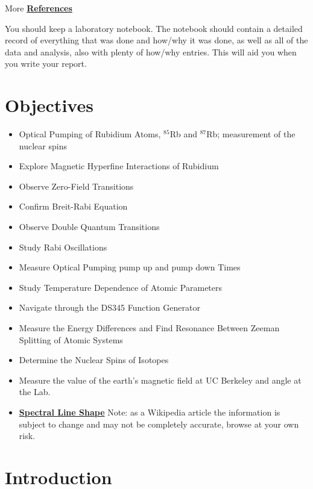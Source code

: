 \documentclass{../lab}
\newcommand{\SpectralLineShape}{https://en.wikipedia.org/wiki/Spectral_line_shape}
\begin{document}
\vspace{1em}

\noindent More \hyperref[references]{\textbf{References}}

\vspace{1em}

\noindent You should keep a laboratory notebook. The notebook should contain a detailed record of everything that was done and how/why it was done, as well as all of the data and analysis, also with plenty of how/why entries. This will aid you when you write your report.

\section{Objectives}
\begin{itemize}
    \item Optical Pumping of Rubidium Atoms, $^{85}$Rb and $^{87}$Rb; measurement of the nuclear spins
    \item Explore Magnetic Hyperfine Interactions of Rubidium
    \item Observe Zero-Field Transitions
    \item Confirm Breit-Rabi Equation
    \item Observe Double Quantum Transitions
    \item Study Rabi Oscillations
    \item Measure Optical Pumping pump up and pump down Times
    \item Study Temperature Dependence of Atomic Parameters
    \item Navigate through the DS345 Function Generator
    \item Measure the Energy Differences and Find Resonance Between Zeeman Splitting of Atomic Systems
    \item Determine the Nuclear Spins of Isotopes
    \item Measure the value of the earth's magnetic field at UC Berkeley and angle at the Lab.
    \item \href{\SpectralLineShape}{\textbf{Spectral Line Shape}} Note: as a Wikipedia article the information is subject to change and may not be completely accurate, browse at your own risk.
\end{itemize}

\section{Introduction}
\end{document}
